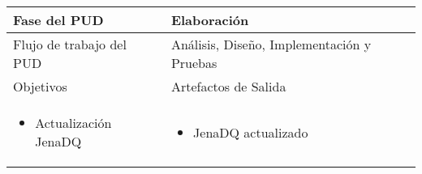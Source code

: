 \vspace{1cm}
\begin{tabular}{|p{}|p{}|}

\hline

\cellcolor[gray]{0.7}Fase del \acs{PUD} & Elaboración
 \\
\hline

\cellcolor[gray]{0.7}Flujo de trabajo del \acs{PUD} & Análisis, Diseño, Implementación y Pruebas
 \\
\hline



\cellcolor[gray]{0.7}Objetivos  &
\cellcolor[gray]{0.7}Artefactos de Salida \\
\hline

\begin{itemize}
\item Actualización JenaDQ
\end{itemize}

&

\begin{itemize}
\item JenaDQ actualizado
\end{itemize}
 \\
\hline
\end{tabular}



